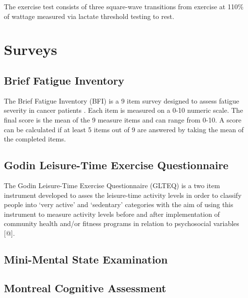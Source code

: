 \documentclass[
]{book}
\begin{document}
The exercise test consists of three square-wave transitions from exercise at 110\% of wattage measured via lactate threshold testing to rest.

\hypertarget{appendix-appendix}{%
\appendix}


\hypertarget{Appendix-Surveys}{%
\chapter{Surveys}\label{Appendix-Surveys}}

\hypertarget{Appendix-Surveys-bfi}{%
\section{Brief Fatigue Inventory}\label{Appendix-Surveys-bfi}}

The Brief Fatigue Inventory (BFI) is a 9 item survey designed to assess fatigue severity in cancer patients \citep{mendoza1999}. Each item is measured on a 0-10 numeric scale. The final score is the mean of the 9 measure items and can range from 0-10. A score can be calculated if at least 5 items out of 9 are answered by taking the mean of the completed items.

\hypertarget{Appendix-Surveys-glteq}{%
\section{Godin Leisure-Time Exercise Questionnaire}\label{Appendix-Surveys-glteq}}

The Godin Leisure-Time Exercise Questionnaire (GLTEQ) is a two item instrument developed to asses the leisure-time activity levels in order to classify people into `very active' and `sedentary' categories with the aim of using this instrument to measure activity levels before and after implementation of community health and/or fitness programs in relation to psychosocial variables {[}@{]}.

\hypertarget{Appendix-Surveys-mmse}{%
\section{Mini-Mental State Examination}\label{Appendix-Surveys-mmse}}

\hypertarget{Appendix-Surveys-moca}{%
\section{Montreal Cognitive Assessment}\label{Appendix-Surveys-moca}}
\end{document}
